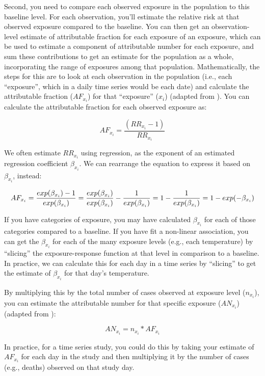 \documentclass[
]{book}
\begin{document}
Second, you need to compare each observed exposure in the population to this baseline level. For each observation, you'll estimate the relative risk at that observed exposure compared to the baseline. You can then get an observation-level estimate of attributable fraction for each exposure of an exposure, which can be used to estimate a component of attributable number for each exposure, and sum these contributions to get an estimate for the population as a whole, incorporating the range of exposures among that population. Mathematically, the steps for this are to look at each observation in the population (i.e., each ``exposure'', which in a daily time series would be each date) and calculate the attributable fraction (\(AF_{x_i}\)) for that ``exposure'' (\(x_i\)) (adapted from \citet{gasparrini2014attributable}). You can calculate the attributable fraction for each observed exposure as:

\[
AF_{x_i} = \frac{(RR_{x_i} - 1)}{RR_{x_i}}
\]

We often estimate \(RR_{x_i}\) using regression, as the exponent of an estimated regression coefficient \(\beta_{x_i}\). We can rearrange the equation to express it based on \(\beta_{x_i}\), instead:

\[
AF_{x_i} = \frac{exp(\beta_{x_i}) - 1}{exp(\beta_{x_i})} \\
= \frac{exp(\beta_{x_i})}{exp(\beta_{x_i})} - \frac{1}{exp(\beta_{x_i})} \\
= 1 - \frac{1}{exp(\beta_{x_i})} \\
= 1 - exp(-\beta_{x_i})
\]

If you have categories of exposure, you may have calculated \(\beta_{x_i}\) for each of those categories compared to a baseline. If you have fit a non-linear association, you can get the \(\beta_{x_i}\) for each of the many exposure levels (e.g., each temperature) by ``slicing'' the exposure-response function at that level in comparison to a baseline. In practice, we can calculate this for each day in a time series by ``slicing'' to get the estimate of \(\beta_{x_i}\) for that day's temperature.

By multiplying this by the total number of cases observed at exposure level (\(n_{x_i}\)), you can estimate the attributable number for that specific exposure (\(AN_{x_i}\)) (adapted from \citet{gasparrini2014attributable}):

\[
AN_{x_i} = n_{x_i} * AF_{x_i}
\]

In practice, for a time series study, you could do this by taking your estimate of \(AF_{x_i}\) for each day in the study and then multiplying it by the number of cases (e.g., deaths) observed on that study day.
\end{document}
